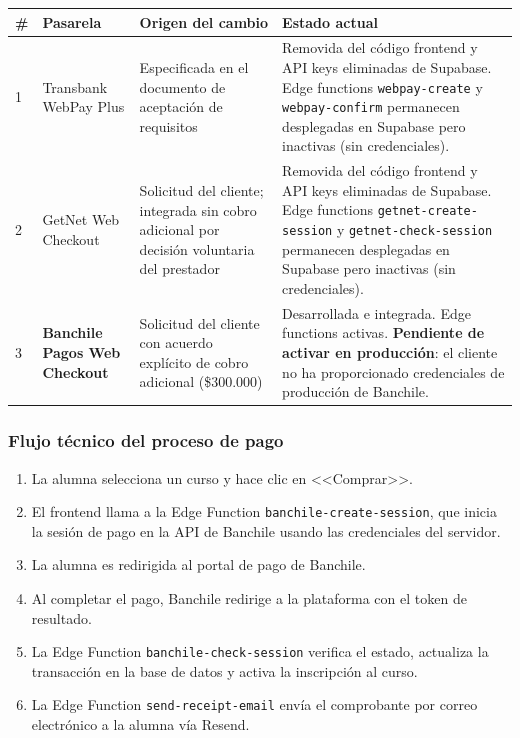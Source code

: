 \documentclass[a4paper,11pt]{article}
\begin{document}
\renewcommand{\arraystretch}{1.3}
\begin{longtable}{C{0.6cm} L{3.8cm} L{4.2cm} L{5.8cm}}
\toprule
\textbf{\#} & \textbf{Pasarela} & \textbf{Origen del cambio} & \textbf{Estado actual} \\
\midrule
\endhead
\bottomrule
\endfoot

1 &
  Transbank WebPay Plus &
  Especificada en el documento de aceptaci\'on de requisitos &
  Removida del c\'odigo frontend y API keys eliminadas de Supabase.
  Edge functions \texttt{webpay-create} y \texttt{webpay-confirm}
  permanecen desplegadas en Supabase pero inactivas (sin credenciales). \\

2 &
  GetNet Web Checkout &
  Solicitud del cliente; integrada sin cobro adicional por decisi\'on voluntaria del prestador &
  Removida del c\'odigo frontend y API keys eliminadas de Supabase.
  Edge functions \texttt{getnet-create-session} y \texttt{getnet-check-session}
  permanecen desplegadas en Supabase pero inactivas (sin credenciales). \\

3 &
  \textbf{Banchile Pagos Web Checkout} &
  Solicitud del cliente con acuerdo expl\'icito de cobro adicional (\$300.000) &
  Desarrollada e integrada. Edge functions activas.
  \textbf{Pendiente de activar en producci\'on}: el cliente no ha
  proporcionado credenciales de producci\'on de Banchile. \\

\end{longtable}

\subsubsection{Flujo t\'ecnico del proceso de pago}

\begin{enumerate}[leftmargin=1.6em, itemsep=3pt]
  \item La alumna selecciona un curso y hace clic en <<Comprar>>.
  \item El frontend llama a la Edge Function \texttt{banchile-create-session},
        que inicia la sesi\'on de pago en la API de Banchile usando las credenciales del servidor.
  \item La alumna es redirigida al portal de pago de Banchile.
  \item Al completar el pago, Banchile redirige a la plataforma con el token de resultado.
  \item La Edge Function \texttt{banchile-check-session} verifica el estado,
        actualiza la transacci\'on en la base de datos y activa la inscripci\'on al curso.
  \item La Edge Function \texttt{send-receipt-email} env\'ia el comprobante por correo
        electr\'onico a la alumna v\'ia Resend.
\end{enumerate}
\end{document}
